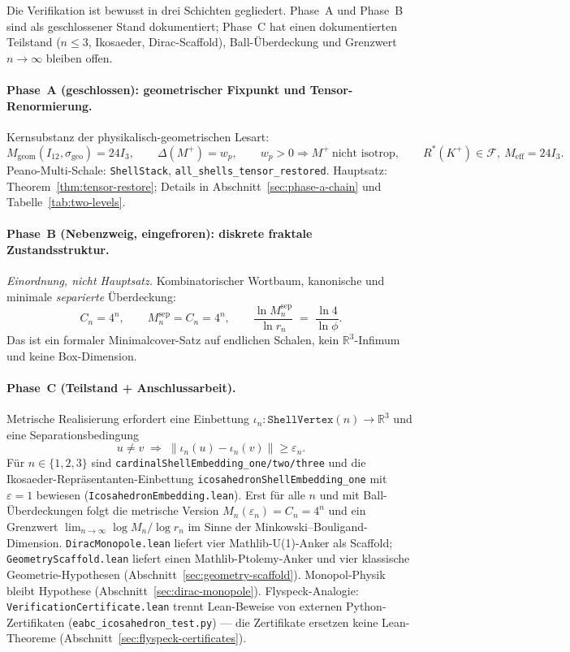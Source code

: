 \documentclass[11pt,a4paper]{article}
\begin{document}
	Die Verifikation ist bewusst in drei Schichten gegliedert.
	Phase~A und Phase~B sind als geschlossener Stand dokumentiert;
	Phase~C hat einen dokumentierten Teilstand ($n\le 3$, Ikosaeder, Dirac-Scaffold),
	Ball-Überdeckung und Grenzwert $n\to\infty$ bleiben offen.
	
	\paragraph{Phase~A (geschlossen): geometrischer Fixpunkt und Tensor-Renormierung.}
	Kernsubstanz der physikalisch-geometrischen Lesart:
	\[
	M_{\mathrm{geom}}(I_{12},\sigma_{\mathrm{geo}})=24I_3,
	\qquad
	\Delta(M^+)=w_p,
	\qquad
	w_p>0 \Rightarrow M^+\ \text{nicht isotrop},
	\qquad
	R^*(K^+)\in\mathcal{F},\ M_{\mathrm{eff}}=24I_3.
	\]
	Peano-Multi-Schale: \texttt{ShellStack}, \texttt{all\_shells\_tensor\_restored}.
	Hauptsatz: Theorem~\ref{thm:tensor-restore}; Details in
	Abschnitt~\ref{sec:phase-a-chain} und Tabelle~\ref{tab:two-levels}.
	
	\paragraph{Phase~B (Nebenzweig, eingefroren): diskrete fraktale Zustandsstruktur.}
	\emph{Einordnung, nicht Hauptsatz.}
	Kombinatorischer Wortbaum, kanonische und minimale \emph{separierte} Überdeckung:
	\[
	C_n=4^n,
	\qquad
	M_n^{\mathrm{sep}}=C_n=4^n,
	\qquad
	\frac{\ln M_n^{\mathrm{sep}}}{\ln r_n}
	\;=\;
	\frac{\ln 4}{\ln\phi}.
	\]
	Das ist ein formaler Minimalcover-Satz auf endlichen Schalen, kein
	$\mathbb{R}^3$-Infimum und keine Box-Dimension.
	
	\paragraph{Phase~C (Teilstand + Anschlussarbeit).}
	Metrische Realisierung erfordert eine Einbettung
	$\iota_n:\texttt{ShellVertex}(n)\to\mathbb{R}^3$ und eine Separationsbedingung
	\[
	u\neq v
	\;\Longrightarrow\;
	\|\iota_n(u)-\iota_n(v)\|\ge\varepsilon_n.
	\]
	Für $n\in\{1,2,3\}$ sind \texttt{cardinalShellEmbedding\_one/two/three}
	und die Ikosaeder-Repräsentanten-Einbettung
	\texttt{icosahedronShellEmbedding\_one} mit $\varepsilon=1$ bewiesen
	(\texttt{IcosahedronEmbedding.lean}).
	Erst für alle $n$ und mit Ball-Überdeckungen folgt die metrische Version
	$M_n(\varepsilon_n)=C_n=4^n$ und ein Grenzwert
	$\lim_{n\to\infty}\log M_n/\log r_n$ im Sinne der Minkowski--Bouligand-Dimension.
	\texttt{DiracMonopole.lean} liefert vier Mathlib-U(1)-Anker als Scaffold;
	\texttt{GeometryScaffold.lean} liefert einen Mathlib-Ptolemy-Anker und vier
	klassische Geometrie-Hypothesen (Abschnitt~\ref{sec:geometry-scaffold}).
	Monopol-Physik bleibt Hypothese (Abschnitt~\ref{sec:dirac-monopole}).
	Flyspeck-Analogie: \texttt{VerificationCertificate.lean} trennt Lean-Beweise
	von externen Python-Zertifikaten (\texttt{eabc\_icosahedron\_test.py}) ---
	die Zertifikate ersetzen keine Lean-Theoreme
	(Abschnitt~\ref{sec:flyspeck-certificates}).
	
\end{document}
